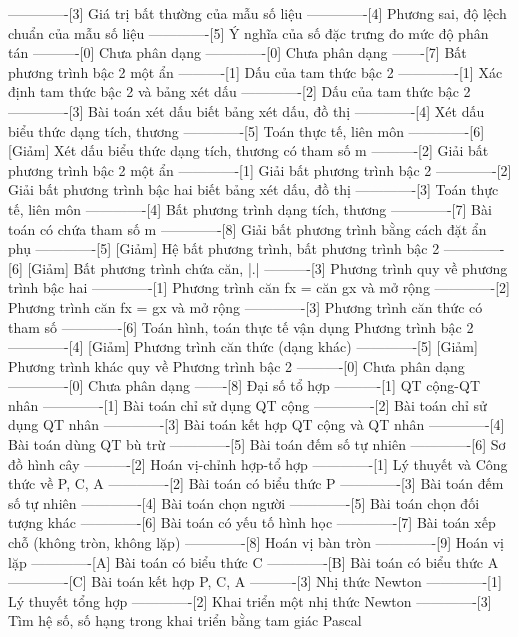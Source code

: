 -------------[3] Giá trị bất thường của mẫu số liệu
-------------[4] Phương sai, độ lệch chuẩn của mẫu số liệu
-------------[5] Ý nghĩa của số đặc trưng đo mức độ phân tán
----------[0] Chưa phân dạng
-------------[0] Chưa phân dạng
-------[7] Bất phương trình bậc 2 một ẩn
----------[1] Dấu của tam thức bậc 2
-------------[1] Xác định tam thức bậc 2 và bảng xét dấu
-------------[2] Dấu của tam thức bậc 2
-------------[3] Bài toán xét dấu biết bảng xét dấu, đồ thị
-------------[4] Xét dấu biểu thức dạng tích, thương
-------------[5] Toán thực tế, liên môn
-------------[6] [Giảm] Xét dấu biểu thức dạng tích, thương có tham số m
----------[2] Giải bất phương trình bậc 2 một ẩn
-------------[1] Giải bất phương trình bậc 2
-------------[2] Giải bất phương trình bậc hai biết bảng xét dấu, đồ thị
-------------[3] Toán thực tế, liên môn
-------------[4] Bất phương trình dạng tích, thương
-------------[7] Bài toán có chứa tham số m
-------------[8] Giải bất phương trình bằng cách đặt ẩn phụ
-------------[5] [Giảm] Hệ bất phương trình, bất phương trình bậc 2
-------------[6] [Giảm] Bất phương trình chứa căn, |.|
----------[3] Phương trình quy về phương trình bậc hai
-------------[1] Phương trình căn fx = căn gx và mở rộng
-------------[2] Phương trình căn fx = gx và mở rộng
-------------[3] Phương trình căn thức có tham số
-------------[6] Toán hình, toán thực tế vận dụng Phương trình bậc 2
-------------[4] [Giảm] Phương trình căn thức (dạng khác)
-------------[5] [Giảm] Phương trình khác quy về Phương trình bậc 2
----------[0] Chưa phân dạng
-------------[0] Chưa phân dạng
-------[8] Đại số tổ hợp
----------[1] QT cộng-QT nhân
-------------[1] Bài toán chỉ sử dụng QT cộng
-------------[2] Bài toán chỉ sử dụng QT nhân
-------------[3] Bài toán kết hợp QT cộng và QT nhân
-------------[4] Bài toán dùng QT bù trừ
-------------[5] Bài toán đếm số tự nhiên
-------------[6] Sơ đồ hình cây
----------[2] Hoán vị-chỉnh hợp-tổ hợp
-------------[1] Lý thuyết và Công thức về P, C, A
-------------[2] Bài toán có biểu thức P
-------------[3] Bài toán đếm số tự nhiên
-------------[4] Bài toán chọn người
-------------[5] Bài toán chọn đối tượng khác
-------------[6] Bài toán có yếu tố hình học
-------------[7] Bài toán xếp chỗ (không tròn, không lặp)
-------------[8] Hoán vị bàn tròn
-------------[9] Hoán vị lặp
-------------[A] Bài toán có biểu thức C
-------------[B] Bài toán có biểu thức A
-------------[C] Bài toán kết hợp P, C, A
----------[3] Nhị thức Newton
-------------[1] Lý thuyết tổng hợp 
-------------[2] Khai triển một nhị thức Newton
-------------[3] Tìm hệ số, số hạng trong khai triển bằng tam giác Pascal
